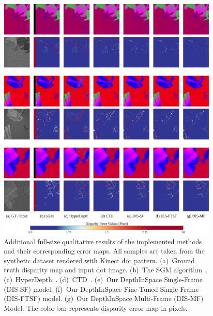 \begin{figure}
    \begin{center}
        \includegraphics[width=1\linewidth]{images/chapter2/supp_figures/supp_results_1.jpg}
    \end{center}
   \caption{Additional full-size qualitative results of the implemented methods and their corresponding error maps. All samples are taken from the synthetic dataset rendered with Kinect dot pattern. (a)~Ground truth disparity map and input dot image. (b)~The SGM algorithm~\citep{hirschmuller2007stereo}. (c)~HyperDepth~\citep{ryan2016hyperdepth}. (d)~CTD~\citep{riegler2019connecting}. (e)~Our DepthInSpace Single-Frame (DIS-SF) model. (f)~Our DepthInSpace Fine-Tuned Single-Frame (DIS-FTSF) model. (g)~Our DepthInSpace Multi-Frame (DIS-MF) Model. The color bar represents disparity error map in pixels.}
    \label{fig:c2_kinect_results}
\end{figure}

